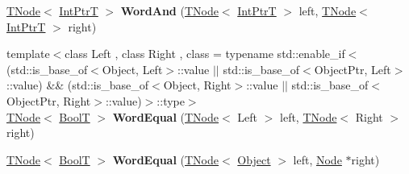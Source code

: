 \begin{DoxyCompactItemize}
\item 
\mbox{\label{classv8_1_1internal_1_1compiler_1_1CodeAssembler_a6360863dbbe4b8dc691848d6857ffdc8}} 
\mbox{\hyperlink{classv8_1_1internal_1_1compiler_1_1TNode}{T\+Node}}$<$ \mbox{\hyperlink{structv8_1_1internal_1_1IntPtrT}{Int\+PtrT}} $>$ {\bfseries Word\+And} (\mbox{\hyperlink{classv8_1_1internal_1_1compiler_1_1TNode}{T\+Node}}$<$ \mbox{\hyperlink{structv8_1_1internal_1_1IntPtrT}{Int\+PtrT}} $>$ left, \mbox{\hyperlink{classv8_1_1internal_1_1compiler_1_1TNode}{T\+Node}}$<$ \mbox{\hyperlink{structv8_1_1internal_1_1IntPtrT}{Int\+PtrT}} $>$ right)
\item 
\mbox{\label{classv8_1_1internal_1_1compiler_1_1CodeAssembler_aca4089737ccdab0b44686ab589ed5481}} 
{\footnotesize template$<$class Left , class Right , class  = typename std\+::enable\+\_\+if$<$                (std\+::is\+\_\+base\+\_\+of$<$\+Object, Left$>$\+::value $\vert$$\vert$                 std\+::is\+\_\+base\+\_\+of$<$\+Object\+Ptr, Left$>$\+::value) \&\&                (std\+::is\+\_\+base\+\_\+of$<$\+Object, Right$>$\+::value $\vert$$\vert$                 std\+::is\+\_\+base\+\_\+of$<$\+Object\+Ptr, Right$>$\+::value)$>$\+::type$>$ }\\\mbox{\hyperlink{classv8_1_1internal_1_1compiler_1_1TNode}{T\+Node}}$<$ \mbox{\hyperlink{structv8_1_1internal_1_1BoolT}{BoolT}} $>$ {\bfseries Word\+Equal} (\mbox{\hyperlink{classv8_1_1internal_1_1compiler_1_1TNode}{T\+Node}}$<$ Left $>$ left, \mbox{\hyperlink{classv8_1_1internal_1_1compiler_1_1TNode}{T\+Node}}$<$ Right $>$ right)
\item 
\mbox{\label{classv8_1_1internal_1_1compiler_1_1CodeAssembler_a9140ff84cef88838820fea57ce40934c}} 
\mbox{\hyperlink{classv8_1_1internal_1_1compiler_1_1TNode}{T\+Node}}$<$ \mbox{\hyperlink{structv8_1_1internal_1_1BoolT}{BoolT}} $>$ {\bfseries Word\+Equal} (\mbox{\hyperlink{classv8_1_1internal_1_1compiler_1_1TNode}{T\+Node}}$<$ \mbox{\hyperlink{classv8_1_1internal_1_1Object}{Object}} $>$ left, \mbox{\hyperlink{classv8_1_1internal_1_1compiler_1_1Node}{Node}} $\ast$right)
\item 
\mbox{\label{classv8_1_1internal_1_1compiler_1_1CodeAssembler_a0e5175e56c8280de46f45e1e8fd71195}} 

\end{DoxyCompactItemize}
